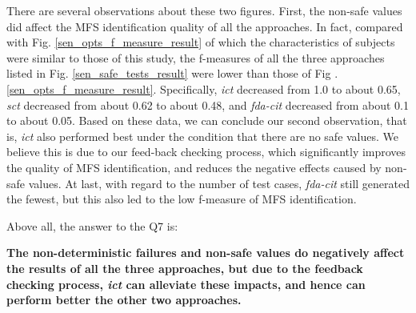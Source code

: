 \documentclass[10pt,journal,compsoc]{IEEEtran}
\begin{document}
There are several observations about these two figures. First, the non-safe values did affect the MFS identification quality of all the approaches. In fact, compared with Fig. \ref{sen_opts_f_measure_result} of which the characteristics of subjects were similar to those of this study, the f-measures of all the three approaches listed in Fig. \ref{sen_safe_tests_result} were lower than those of Fig .\ref{sen_opts_f_measure_result}. Specifically, \emph{ict} decreased from 1.0 to about 0.65, \emph{sct} decreased from about 0.62 to about 0.48, and \emph{fda-cit} decreased from about 0.1 to about 0.05. Based on these data, we can conclude our second observation, that is, \emph{ict} also performed best under the condition that there are no safe values. We believe this is due to our feed-back checking process, which significantly improves the quality of MFS identification, and reduces the negative effects caused by non-safe values. At last, with regard to the number of test cases, \emph{fda-cit} still generated the fewest, but this also led to the low f-measure of MFS identification.


Above all, the answer to the Q7 is:

\textbf{The non-deterministic failures and non-safe values do negatively affect the results of all the three approaches, but due to the feedback checking process, \emph{ict} can alleviate these impacts, and hence can perform better the other two approaches.}
\end{document}
